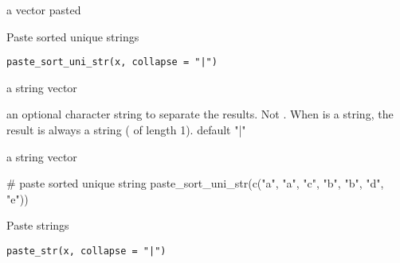 \documentclass[letterpaper]{book}
\begin{document}
%
\begin{Value}
a vector pasted
\end{Value}
%
\begin{Examples}
\end{Examples}
%
\begin{Description}
Paste sorted unique strings
\end{Description}
%
\begin{Usage}
\begin{verbatim}
paste_sort_uni_str(x, collapse = "|")
\end{verbatim}
\end{Usage}
%
\begin{Arguments}
\begin{ldescription}
\item[\code{x}] a string vector

\item[\code{collapse}] an optional character string to separate the results. Not
. When  is a string, the result is always a string
( of length 1). default "|"
\end{ldescription}
\end{Arguments}
%
\begin{Value}
a string vector
\end{Value}
%
\begin{Examples}
\begin{ExampleCode}
# paste sorted unique string
paste_sort_uni_str(c("a", "a", "c", "b", "b", "d", "e"))

\end{ExampleCode}
\end{Examples}
%
\begin{Description}
Paste strings
\end{Description}
%
\begin{Usage}
\begin{verbatim}
paste_str(x, collapse = "|")
\end{verbatim}
\end{Usage}
\end{document}
